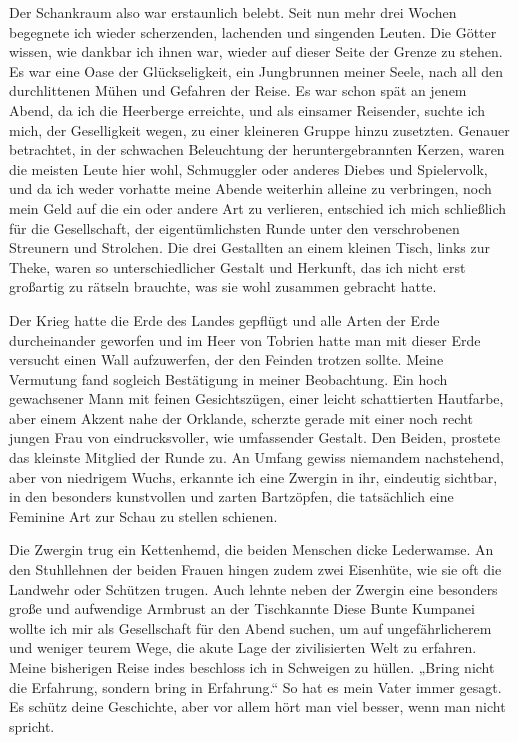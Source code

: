 Der Schankraum also war erstaunlich belebt. Seit nun mehr drei Wochen begegnete ich wieder scherzenden, lachenden und singenden Leuten. Die Götter wissen, wie dankbar ich ihnen war, wieder auf dieser Seite der Grenze zu stehen. Es war eine Oase der Glückseligkeit, ein Jungbrunnen meiner Seele, nach all den durchlittenen Mühen und Gefahren der Reise. Es war schon spät an jenem Abend, da ich die Heerberge erreichte, und als einsamer Reisender, suchte ich mich, der Geselligkeit wegen, zu einer kleineren Gruppe hinzu zusetzten. Genauer betrachtet, in der schwachen Beleuchtung der heruntergebrannten Kerzen, waren die meisten Leute hier wohl, Schmuggler oder anderes Diebes und Spielervolk, und da ich weder vorhatte meine Abende weiterhin alleine zu verbringen, noch mein Geld auf die ein oder andere Art zu verlieren, entschied ich mich schließlich für die Gesellschaft, der eigentümlichsten Runde unter den verschrobenen Streunern und Strolchen. Die drei Gestallten an einem kleinen Tisch, links zur Theke, waren so unterschiedlicher Gestalt und Herkunft, das ich nicht erst großartig zu rätseln brauchte, was sie wohl zusammen gebracht hatte.

Der Krieg hatte die Erde des Landes gepflügt und alle Arten der Erde durcheinander geworfen und im Heer von Tobrien hatte man mit dieser Erde versucht einen Wall aufzuwerfen, der den Feinden trotzen sollte. Meine Vermutung fand sogleich Bestätigung in meiner Beobachtung. Ein hoch gewachsener Mann mit feinen Gesichtszügen, einer leicht schattierten Hautfarbe, aber einem Akzent nahe der Orklande, scherzte gerade mit einer noch recht jungen Frau von eindrucksvoller, wie umfassender Gestalt. Den Beiden, prostete das kleinste Mitglied der Runde zu. An Umfang gewiss niemandem nachstehend, aber von niedrigem Wuchs, erkannte ich eine Zwergin in ihr, eindeutig sichtbar, in den besonders kunstvollen und zarten Bartzöpfen, die tatsächlich eine Feminine Art zur Schau zu stellen schienen.

Die Zwergin trug ein Kettenhemd, die beiden Menschen dicke Lederwamse. An den Stuhllehnen der beiden Frauen hingen zudem zwei Eisenhüte, wie sie oft die Landwehr oder Schützen trugen. Auch lehnte neben der Zwergin eine besonders große und aufwendige Armbrust an der Tischkannte Diese Bunte Kumpanei wollte ich mir als Gesellschaft für den Abend suchen, um auf ungefährlicherem und weniger teurem Wege, die akute Lage der zivilisierten Welt zu erfahren. Meine bisherigen Reise indes beschloss ich in Schweigen zu hüllen. „Bring nicht die Erfahrung, sondern bring in Erfahrung.“ So hat es mein Vater immer gesagt. Es schütz deine Geschichte, aber vor allem hört man viel besser, wenn man nicht spricht.

